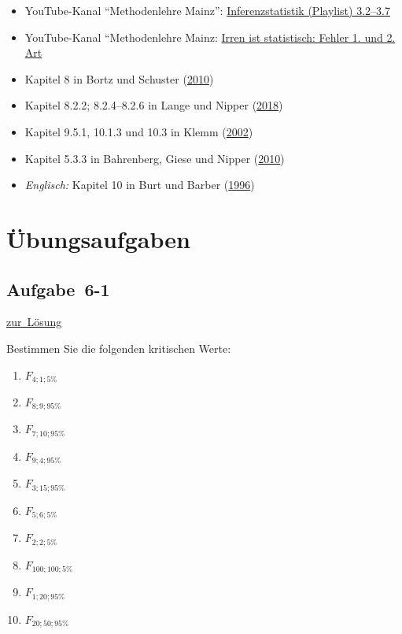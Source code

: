 \documentclass[
  11pt,
  ngerman,
  a4paper,
]{report}
\providecommand{\tightlist}{%
  \setlength{\itemsep}{0pt}\setlength{\parskip}{0pt}}
\begin{document}
\begin{itemize}
\tightlist
\item
  YouTube-Kanal \enquote{Methodenlehre Mainz}: \href{https://www.youtube.com/watch?v=pCCvA28l9es\&index=17\&list=PLSFgFMMLqanK_DUMJycmua0ODSaKq28Gb}{Inferenzstatistik (Playlist) 3.2--3.7}
\item
  YouTube-Kanal ``Methodenlehre Mainz: \href{https://www.youtube.com/watch?v=q1jkbDMwflg}{Irren ist statistisch: Fehler 1. und 2. Art}
\item
  Kapitel 8 in Bortz und Schuster (\protect\hyperlink{ref-bortz}{2010})
\item
  Kapitel 8.2.2; 8.2.4--8.2.6 in Lange und Nipper (\protect\hyperlink{ref-delange}{2018})
\item
  Kapitel 9.5.1, 10.1.3 und 10.3 in Klemm (\protect\hyperlink{ref-klemm}{2002})
\item
  Kapitel 5.3.3 in Bahrenberg, Giese und Nipper (\protect\hyperlink{ref-bahrenberg}{2010})
\item
  \emph{Englisch:} Kapitel 10 in Burt und Barber (\protect\hyperlink{ref-burt}{1996})
\end{itemize}

\hypertarget{uxfcbungsaufgaben-5}{%
\section*{Übungsaufgaben}\label{uxfcbungsaufgaben-5}}

\nopagebreak

\hypertarget{aufgabe-6-1}{%
\subsection{Aufgabe~6-1}\label{aufgabe-6-1}}

\protect\hyperlink{loesung-6-1}{zur~Lösung}

Bestimmen Sie die folgenden kritischen Werte:

\begin{enumerate}
\def\labelenumi{\alph{enumi})}
\tightlist
\item
  \(F_{4;1;5\%}\)
\item
  \(F_{8;9;95\%}\)
\item
  \(F_{7;10;95\%}\)
\item
  \(F_{9;4;95\%}\)
\item
  \(F_{3;15;95\%}\)
\item
  \(F_{5;6;5\%}\)
\item
  \(F_{2;2;5\%}\)
\item
  \(F_{100;100;5\%}\)
\item
  \(F_{1;20;95\%}\)
\item
  \(F_{20;50;95\%}\)
\end{enumerate}
\end{document}
